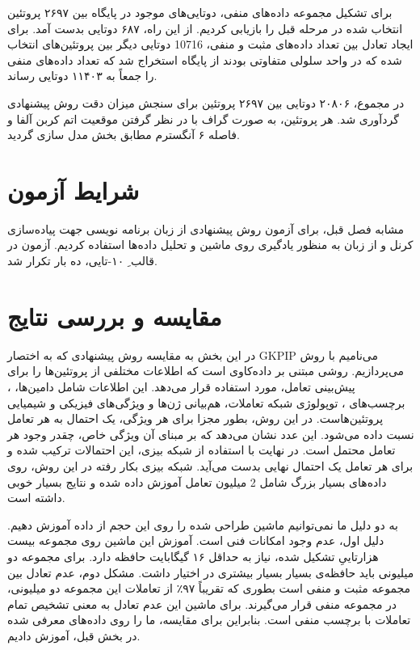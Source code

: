 برای تشکیل مجموعه داده‌های منفی، دوتایی‌های موجود در پایگاه  بین ۲۶۹۷ پروتئین انتخاب شده در مرحله قبل را بازیابی کردیم. از این راه، ۶۸۷ دوتایی بدست آمد. برای ایجاد تعادل بین تعداد داده‌های مثبت و منفی، 10716 دوتایی دیگر بین پروتئین‌های انتخاب شده که در واحد سلولی متفاوتی بودند از پایگاه  استخراج شد که تعداد داده‌های منفی را جمعاً به ۱۱۴۰۳ دوتایی رساند.

در مجموع، ۲۰۸۰۶ دوتایی بین ۲۶۹۷ پروتئین برای سنجش میزان دقت روش پیشنهادی گردآوری شد. هر پروتئین، به صورت گراف با در نظر گرفتن موقعیت اتم کربن آلفا و فاصله ۶ آنگسترم مطابق بخش  مدل سازی گردید.

\section{شرایط آزمون}
مشابه فصل قبل، برای آزمون روش پیشنهادی از زبان برنامه نویسی  جهت پیاده‌سازی کرنل‌ و از زبان  به منظور یادگیری روی ماشین  و تحلیل داده‌ها استفاده کردیم. آزمون در قالب ِ ۱۰-تایی، ده بار تکرار شد.

\section{مقایسه و بررسی نتایج}
در این بخش به مقایسه روش پیشنهادی که به اختصار GKPIP می‌نامیم با روش  می‌پردازیم.  روشی مبتنی بر داده‌کاوی است که اطلاعات مختلفی از پروتئین‌ها را برای پیش‌بینی تعامل، مورد استفاده قرار می‌دهد. این اطلاعات شامل دامین‌ها، ، برچسب‌های ، توپولوژی شبکه تعاملات، هم‌بیانی ژن‌ها و ویژگی‌های فیزیکی و شیمیایی پروتئین‌هاست. در این روش، بطور مجزا برای هر ويژگی، یک احتمال به هر تعامل نسبت داده می‌شود. این عدد نشان می‌دهد که بر مبنای آن ویژگی خاص، چقدر وجود هر تعامل محتمل است. در نهایت با استفاده از شبکه بیزی، این احتمالات ترکیب شده و برای هر تعامل یک احتمال نهایی بدست می‌آید.  شبکه بیزی بکار رفته در این روش، روی داده‌های بسیار بزرگ شامل 2 میلیون تعامل آموزش داده شده و  نتایج بسیار خوبی داشته است.

به دو دلیل ما نمی‌توانیم ماشین  طراحی شده را روی این حجم از داده آموزش دهیم. دلیل اول، عدم وجود امکانات فنی است. آموزش این ماشین روی مجموعه بیست هزارتاییِ تشکیل شده، نیاز به حداقل ۱۶ گیگابایت حافظه دارد. برای مجموعه دو میلیونی باید حافظه‌ی بسیار بسیار بیشتری در اختیار داشت. مشکل دوم، عدم تعادل بین مجموعه مثبت و منفی است بطوری که  تقریباً ۹۷٪ از تعاملات این مجموعه دو میلیونی، در مجموعه منفی قرار می‌گیرند. برای ماشین  این عدم تعادل به معنی تشخیص تمام تعاملات با برچسب منفی است. بنابراین برای مقایسه، ما  را روی داده‌های معرفی شده در بخش قبل، آموزش دادیم.

